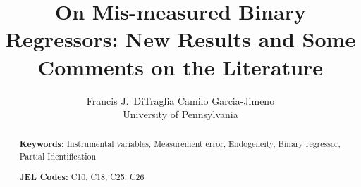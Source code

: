 \documentclass[12pt]{article}
\title{On Mis-measured Binary Regressors: New Results and Some Comments on the Literature}
\author{Francis J.\ DiTraglia  \hspace{2em} Camilo Garcia-Jimeno\\
\normalsize University of Pennsylvania}
\begin{document}
\maketitle


\begin{abstract}
  \singlespacing
	

  	\bigskip
	\noindent\textbf{Keywords:} Instrumental variables, Measurement error, Endogeneity, Binary regressor, Partial Identification

	\medskip
  \noindent\textbf{JEL Codes:} C10, C18, C25, C26
\end{abstract}




%
%
%


%
%




%
\end{document}
